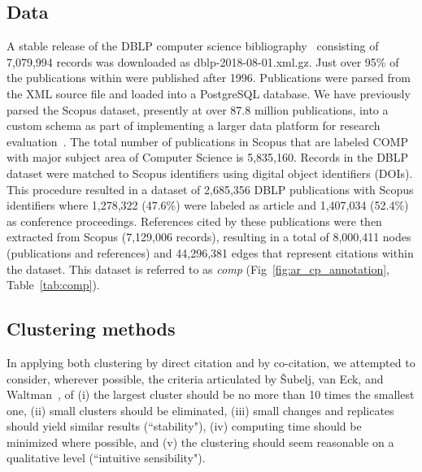 \subsection{Data}
A stable release of the DBLP computer science bibliography~\cite{dblp_ref} consisting of 7,079,994 records was downloaded as dblp-2018-08-01.xml.gz. Just over 95\% of the publications within were published after 1996. Publications were parsed from the XML source file and loaded into a PostgreSQL database.  We have previously parsed the Scopus dataset, presently at over 87.8 million publications, into a custom schema as part of implementing a larger data platform for research evaluation~\cite{GithubERNIE2019}. The total number of publications in Scopus that are labeled COMP with major subject area of Computer Science is 5,835,160. Records in the DBLP dataset were matched to Scopus identifiers using digital object identifiers (DOIs). This procedure resulted in a dataset of 2,685,356 DBLP publications with Scopus identifiers where 1,278,322 (47.6\%) were labeled as article and 1,407,034 (52.4\%) as conference proceedings.  References cited by these publications were then extracted from Scopus (7,129,006 records), resulting in a total of 8,000,411 nodes (publications and references) and 44,296,381 edges that represent citations within the dataset. This dataset is referred to as \emph{comp} (Fig~\ref{fig:ar_cp_annotation}, Table~\ref{tab:comp}).  
 
\subsection{Clustering methods} In applying both clustering by direct citation and by co-citation, we attempted to consider, wherever possible, the criteria articulated by \v{S}ubelj, van Eck, and Waltman~\cite{subelj_clustering_2016}, of (i) the largest cluster should be no more than 10 times the smallest one, (ii) small clusters should be eliminated, (iii) small changes and replicates should yield similar results (``stability"),  (iv) computing time should be minimized where possible, and (v) the clustering should seem reasonable on a qualitative level (``intuitive sensibility").

